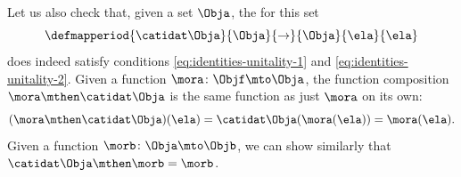 \begin{example}
    Let us also check that, given a set $\Obja$, the  for this set 
    \begin{equation}
        \defmapperiod{
            \catidat\Obja
        }{
            \Obja
        }{
            \to
        }{
            \Obja
        }{
            \ela
        }{
            \ela
        }
    \end{equation}
    does indeed satisfy conditions \cref{eq:identities-unitality-1} and \cref{eq:identities-unitality-2}.
    Given a function $\mora \colon \Objf \mto \Obja$, the function composition $\mora \mthen \catidat\Obja$ is the same function as just $\mora$ on its own:
    \begin{equation}
        (\mora \mthen \catidat\Obja)(\ela)
        = \catidat\Obja(\mora (\ela)) = \mora (\ela).
    \end{equation}
    Given a function $\morb \colon \Obja \mto \Objb$, we can show similarly that $\catidat\Obja \mthen \morb = \morb$.
\end{example}



    







%
%


